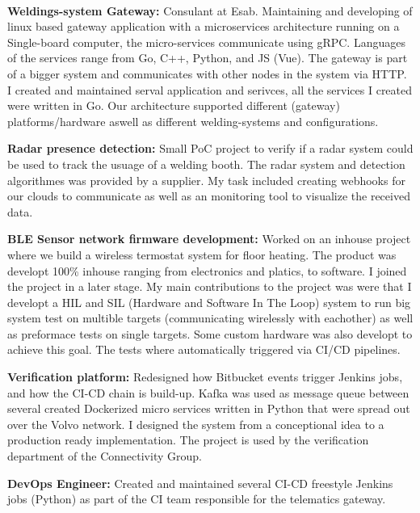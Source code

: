 
 \\
\SmallSep
\textbf{Weldings-system Gateway:} Consulant at Esab. Maintaining and developing of linux based gateway application with a microservices architecture running on a Single-board computer, the micro-services communicate using gRPC. Languages of the services range from Go, C++, Python, and JS (Vue). The gateway is part of a bigger system and communicates with other nodes in the system via HTTP. I created and maintained serval application and serivces, all the services I created were written in Go. Our architecture supported different (gateway) platforms/hardware aswell as different welding-systems and configurations.
\SmallSep

\textbf{Radar presence detection:} Small PoC project to verify if a radar system could be used to track the usuage of a welding booth. The radar system and detection algorithmes was provided by a supplier. My task included creating webhooks for our clouds to communicate as well as an monitoring tool to visualize the received data.
\SmallSep

\textbf{BLE Sensor network firmware development:} Worked on an inhouse project where we build a wireless termostat system for floor heating. The product was developt 100\% inhouse ranging from electronics and platics, to software. I joined the project in a later stage. My main contributions to the project was were that I developt a HIL and SIL (Hardware and Software In The Loop) system to run big system test on multible targets (communicating wirelessly with eachother) as well as preformace tests on single targets. Some custom hardware was also developt to achieve this goal. The tests where automatically triggered via CI/CD pipelines. \\
\Sep


\SmallSep
\textbf{Verification platform:} Redesigned how Bitbucket events trigger Jenkins jobs, and how the CI-CD chain is build-up. Kafka was used as message queue between several created Dockerized micro services written in Python that were spread out over the Volvo network. I designed the system from a conceptional idea to a production ready implementation. The project is used by the verification department of the Connectivity Group.
\SmallSep

\textbf{DevOps Engineer:} Created and maintained several CI-CD freestyle Jenkins jobs (Python) as part of the CI team responsible for the telematics gateway.
\SmallSep

